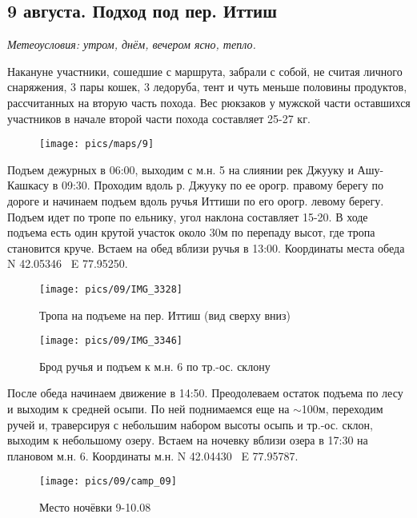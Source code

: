 \subsection{9 августа. Подход под пер. Иттиш}
\textit{Метеоусловия: утром, днём, вечером ясно, тепло.}

Накануне участники, сошедшие с маршрута, забрали с собой, не считая личного снаряжения, 3 пары кошек, 3 ледоруба, тент и чуть меньше половины продуктов, рассчитанных на вторую часть похода. Вес рюкзаков у мужской части оставшихся участников в начале второй части похода составляет 25-27 кг.

\begin{figure}[h!]
	\centering
	\texttt{[image: pics/maps/9]}
	\label{fig:mini_9}
\end{figure}

Подъем дежурных в 06:00, выходим с м.н. 5 на слиянии рек Джууку и Ашу-Кашкасу в 09:30. Проходим вдоль р. Джууку по ее орогр. правому берегу  по дороге и начинаем подъем вдоль ручья Иттиши по его орогр. левому берегу. Подъем идет по тропе по ельнику, угол наклона составляет 15-20\degree. В ходе подъема есть один крутой участок около 30м по перепаду высот, где тропа становится круче. Встаем на обед вблизи ручья в 13:00. Координаты места обеда N 42.05346\degree~ E 77.95250\degree.

\begin{figure}[h!]
	\centering
	\texttt{[image: pics/09/IMG\_3328]}
	\caption{Тропа на подъеме на пер. Иттиш (вид сверху вниз)}
	\label{fig:IMG_3328}
\end{figure}

\begin{figure}[h!]
	\centering
	\texttt{[image: pics/09/IMG\_3346]}
	\caption{Брод ручья и подъем к м.н. 6 по тр.-ос. склону}
	\label{fig:IMG_3346}
\end{figure}


После обеда начинаем движение в 14:50. Преодолеваем остаток подъема по лесу и выходим к средней осыпи. По ней поднимаемся еще на $\sim$100м, переходим ручей и, траверсируя с небольшим набором высоты осыпь и тр.-ос. склон, выходим к небольшому озеру. Встаем на ночевку вблизи озера в 17:30 на плановом м.н. 6. Координаты м.н. N 42.04430\degree~ E 77.95787\degree.


\begin{figure}[h!]
	\centering
	\texttt{[image: pics/09/camp\_09]} %
	\caption{Место ночёвки 9-10.08}
	\label{fig:camp_09}
\end{figure}

\clearpage